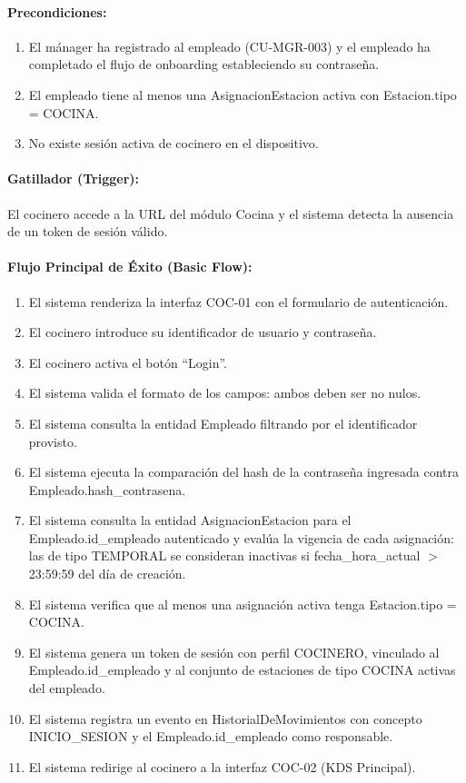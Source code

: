 \paragraph{Precondiciones:}
\begin{enumerate}
    \item[I.] El mánager ha registrado al empleado (CU-MGR-003) y el empleado ha completado el flujo de onboarding estableciendo su contraseña.
    \item[II.] El empleado tiene al menos una AsignacionEstacion activa con Estacion.tipo = COCINA.
    \item[III.] No existe sesión activa de cocinero en el dispositivo.
\end{enumerate}

\paragraph{Gatillador (Trigger):} El cocinero accede a la URL del módulo Cocina y el sistema detecta la ausencia de un token de sesión válido.

\paragraph{Flujo Principal de Éxito (Basic Flow):}
\begin{enumerate}
    \item[I.] El sistema renderiza la interfaz COC-01 con el formulario de autenticación.
    \item[II.] El cocinero introduce su identificador de usuario y contraseña.
    \item[III.] El cocinero activa el botón ``Login''.
    \item[IV.] El sistema valida el formato de los campos: ambos deben ser no nulos.
    \item[V.] El sistema consulta la entidad Empleado filtrando por el identificador provisto.
    \item[VI.] El sistema ejecuta la comparación del hash de la contraseña ingresada contra Empleado.hash\_contrasena.
    \item[VII.] El sistema consulta la entidad AsignacionEstacion para el Empleado.id\_empleado autenticado y evalúa la vigencia de cada asignación: las de tipo TEMPORAL se consideran inactivas si fecha\_hora\_actual $>$ 23:59:59 del día de creación.
    \item[VIII.] El sistema verifica que al menos una asignación activa tenga Estacion.tipo = COCINA.
    \item[IX.] El sistema genera un token de sesión con perfil COCINERO, vinculado al Empleado.id\_empleado y al conjunto de estaciones de tipo COCINA activas del empleado.
    \item[X.] El sistema registra un evento en HistorialDeMovimientos con concepto INICIO\_SESION y el Empleado.id\_empleado como responsable.
    \item[XI.] El sistema redirige al cocinero a la interfaz COC-02 (KDS Principal).
\end{enumerate}

